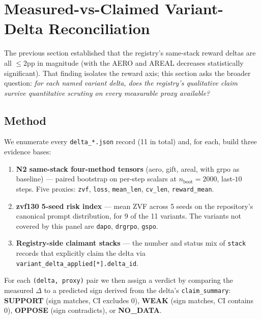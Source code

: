 \section{Measured-vs-Claimed Variant-Delta Reconciliation}
\label{sec:p6-measured-claimed}

The previous section established that the registry's same-stack reward
deltas are all $\leq 2$pp in magnitude (with the AERO and AREAL
decreases statistically significant). That finding isolates the
reward axis; this section asks the broader question: \emph{for each
named variant delta, does the registry's qualitative claim survive
quantitative scrutiny on every measurable proxy available?}

\subsection{Method}
We enumerate every \texttt{delta\_*.json} record (11 in total) and, for
each, build three evidence bases:
\begin{enumerate}
  \item \textbf{N2 same-stack four-method tensors} (aero, gift, areal,
    with grpo as baseline) --- paired bootstrap on per-step scalars at
    $n_{\text{boot}}{=}2000$, last-$10$ steps. Five proxies:
    \texttt{zvf}, \texttt{loss}, \texttt{mean\_len}, \texttt{cv\_len},
    \texttt{reward\_mean}.
  \item \textbf{zvf130 5-seed risk index} --- mean ZVF across 5 seeds
    on the repository's canonical prompt distribution, for 9 of the 11
    variants. The variants not covered by this panel are
    \texttt{dapo}, \texttt{drgrpo}, \texttt{gspo}.
  \item \textbf{Registry-side claimant stacks} --- the number and status
    mix of \texttt{stack} records that explicitly claim the delta via
    \texttt{variant\_delta\_applied[*].delta\_id}.
\end{enumerate}
For each \texttt{(delta, proxy)} pair we then assign a verdict by
comparing the measured $\Delta$ to a predicted sign derived from the
delta's \texttt{claim\_summary}:
\textbf{SUPPORT} (sign matches, CI excludes 0), \textbf{WEAK} (sign
matches, CI contains 0), \textbf{OPPOSE} (sign contradicts), or
\textbf{NO\_DATA}.

